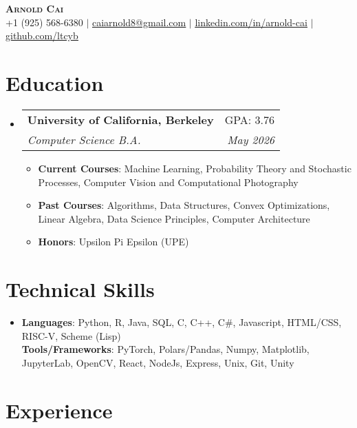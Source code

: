 \documentclass[letterpaper,11pt]{article}
\makeatletter
\newcommand{\resumeItemBF}[2]{
  \item\small{
    \textbf{#1}{: #2 \vspace{-2pt}}
  }
}
\newcommand{\resumeSubheading}[4]{
  \vspace{-2pt}\item
    \begin{tabular*}{0.97\textwidth}[t]{l@{\extracolsep{\fill}}r}
      \textbf{#1} & #2 \\
      \textit{\small#3} & \textit{\small #4} \\
    \end{tabular*}\vspace{-7pt}
}
\newcommand{\resumeSubHeadingListStart}{\begin{itemize}[leftmargin=0.15in, label={}]}
\newcommand{\resumeSubHeadingListEnd}{\end{itemize}}
\newcommand{\resumeItemListStart}{\begin{itemize}}
\newcommand{\resumeItemListEnd}{\end{itemize}\vspace{-5pt}}
\makeatother
\begin{document}
\begin{center}
    \textbf{\Huge \scshape Arnold Cai} \\ \vspace{5pt}
    \small +1 (925) 568-6380 $|$
    \href{mailto:caiarnold8@gmail.c0om}{\underline{caiarnold8@gmail.com}} $|$
    \href{https://www.linkedin.com/in/arnold-cai/}{\underline{linkedin.com/in/arnold-cai}} $|$
    \href{https://github.com/ltcyb/}{\underline{github.com/ltcyb}}
\end{center}

\section{Education}

\resumeSubHeadingListStart
    \resumeSubheading
        {University of California, Berkeley}{GPA: 3.76}{Computer Science B.A.}{May 2026}
        \resumeItemListStart
            \resumeItemBF{Current Courses}{Machine Learning, Probability Theory and Stochastic Processes, Computer Vision and Computational Photography}
            \resumeItemBF{Past Courses}{Algorithms, Data Structures, Convex Optimizations, Linear Algebra, Data Science Principles, Computer Architecture}
            \resumeItemBF{Honors}{Upsilon Pi Epsilon (UPE)}
        \resumeItemListEnd
\resumeSubHeadingListEnd

\section{Technical Skills}

\begin{itemize}[leftmargin=0.15in, label={}]
    \item{

    \textbf{Languages}: Python, R, Java, SQL, C, C++, C\#, Javascript, HTML/CSS, RISC-V, Scheme (Lisp)\\

    \textbf{Tools/Frameworks}: PyTorch, Polars/Pandas, Numpy, Matplotlib, JupyterLab, OpenCV, React, NodeJs, Express, Unix, Git, Unity\\

    }

\end{itemize}

\section{Experience}
\end{document}
